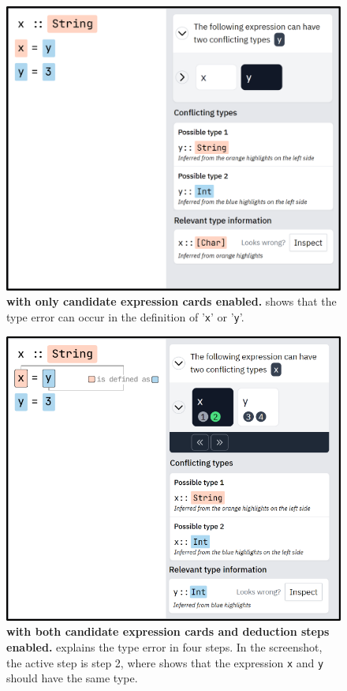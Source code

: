 \begin{figure}
    \centering
    \includegraphics[width=\linewidth]{images/intro-expression.pdf}
    \caption{
        \textbf{\chameleon{} with only candidate expression cards enabled.}
        \chameleon{} shows that the type error can
        occur in the definition of '\texttt{x}' or '\texttt{y}'.
    }
    \label{fig:expression}
\end{figure}


\begin{figure}
    \centering
    \includegraphics[width=\linewidth]{images/intro-deductionstep.pdf}
    \caption{
        \textbf{\chameleon{} with both candidate expression cards and deduction steps
        enabled.}
        \chameleon{} explains the type error in four steps. In the screenshot, the active step is step 2, where \chameleon{} shows that the expression \texttt{x} and \texttt{y} should have the same type. 
    }
    \label{fig:deduction}
\end{figure}



